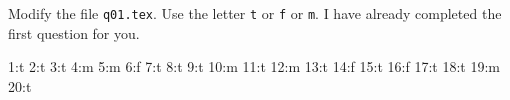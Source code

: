 
Modify the file \verb!q01.tex!.
Use the letter \verb!t! or \verb!f! or \verb!m!.
I have already completed the first question for you.

\begin{console}
1:t
2:t
3:t
4:m
5:m
6:f
7:t
8:t
9:t
10:m
11:t
12:m
13:t
14:f
15:t
16:f
17:t
18:t
19:m
20:t
\end{console}
